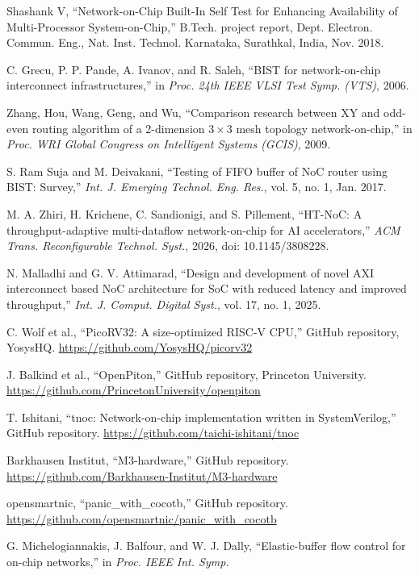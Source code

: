 \documentclass[11pt,a4paper]{article}
\begin{document}
\begin{enumerate}[label={[\arabic*]}, leftmargin=2.2em]
\item Shashank V, ``Network-on-Chip Built-In Self Test for Enhancing
Availability of Multi-Processor System-on-Chip,'' B.Tech. project report,
Dept. Electron. Commun. Eng., Nat. Inst. Technol. Karnataka, Surathkal,
India, Nov. 2018.
\item C. Grecu, P. P. Pande, A. Ivanov, and R. Saleh, ``BIST for
network-on-chip interconnect infrastructures,'' in \emph{Proc. 24th IEEE VLSI
Test Symp. (VTS)}, 2006.
\item Zhang, Hou, Wang, Geng, and Wu, ``Comparison research between XY and
odd-even routing algorithm of a 2-dimension $3\times3$ mesh topology
network-on-chip,'' in \emph{Proc. WRI Global Congress on Intelligent Systems
(GCIS)}, 2009.
\item S. Ram Suja and M. Deivakani, ``Testing of FIFO buffer of NoC router
using BIST: Survey,'' \emph{Int. J. Emerging Technol. Eng. Res.}, vol. 5,
no. 1, Jan. 2017.
\item M. A. Zhiri, H. Krichene, C. Sandionigi, and S. Pillement, ``HT-NoC: A
throughput-adaptive multi-dataflow network-on-chip for AI accelerators,''
\emph{ACM Trans. Reconfigurable Technol. Syst.}, 2026,
doi: 10.1145/3808228.
\item N. Malladhi and G. V. Attimarad, ``Design and development of novel AXI
interconnect based NoC architecture for SoC with reduced latency and improved
throughput,'' \emph{Int. J. Comput. Digital Syst.}, vol. 17, no. 1, 2025.
\item C. Wolf et al., ``PicoRV32: A size-optimized RISC-V CPU,'' GitHub
repository, YosysHQ. \url{https://github.com/YosysHQ/picorv32}
\item J. Balkind et al., ``OpenPiton,'' GitHub repository, Princeton
University. \url{https://github.com/PrincetonUniversity/openpiton}
\item T. Ishitani, ``tnoc: Network-on-chip implementation written in
SystemVerilog,'' GitHub repository.
\url{https://github.com/taichi-ishitani/tnoc}
\item Barkhausen Institut, ``M3-hardware,'' GitHub repository.
\url{https://github.com/Barkhausen-Institut/M3-hardware}
\item opensmartnic, ``panic\_with\_cocotb,'' GitHub repository.
\url{https://github.com/opensmartnic/panic_with_cocotb}
\item G. Michelogiannakis, J. Balfour, and W. J. Dally, ``Elastic-buffer flow
control for on-chip networks,'' in \emph{Proc. IEEE Int. Symp.
}
\end{enumerate}
\end{document}
